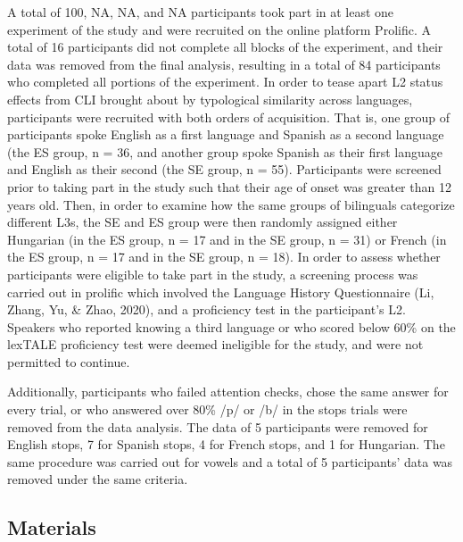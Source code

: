 \documentclass[
  man]{apa6}
\begin{document}
A total of 100, NA, NA, and NA participants took part in at least one experiment of the study and were recruited on the online platform Prolific. A total of 16 participants did not complete all blocks of the experiment, and their data was removed from the final analysis, resulting in a total of 84 participants who completed all portions of the experiment.
In order to tease apart L2 status effects from CLI brought about by typological similarity across languages, participants were recruited with both orders of acquisition.
That is, one group of participants spoke English as a first language and Spanish as a second language (the ES group, n = 36, and another group spoke Spanish as their first language and English as their second (the SE group, n = 55). Participants were screened prior to taking part in the study such that their age of onset was greater than 12 years old.
Then, in order to examine how the same groups of bilinguals categorize different L3s, the SE and ES group were then randomly assigned either Hungarian (in the ES group, n = 17 and in the SE group, n =
31) or French (in the ES group, n = 17 and in the SE group, n = 18).
In order to assess whether participants were eligible to take part in the study, a screening process was carried out in prolific which involved the Language History Questionnaire (Li, Zhang, Yu, \& Zhao, 2020), and a proficiency test in the participant's L2.
Speakers who reported knowing a third language or who scored below 60\% on the lexTALE proficiency test were deemed ineligible for the study, and were not permitted to continue.

Additionally, participants who failed attention checks, chose the same answer for every trial, or who answered over 80\% /p/ or /b/ in the stops trials were removed from the data analysis.
The data of 5 participants were removed for English stops, 7 for Spanish stops, 4 for French stops, and 1 for Hungarian. The same procedure was carried out for vowels and a total of 5 participants' data was removed under the same criteria.

\hypertarget{materials}{%
\subsection{Materials}\label{materials}}
\end{document}

